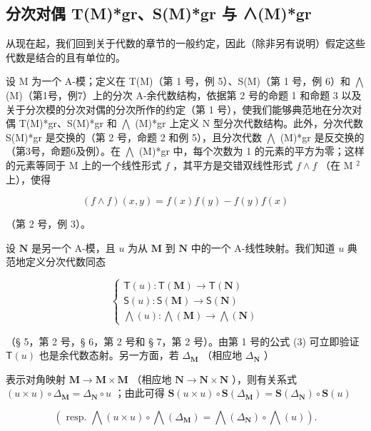 \subsection{分次对偶 T(M)*gr、S(M)*gr 与 ∧(M)*gr}

从现在起，我们回到关于代数的章节的一般约定，因此（除非另有说明）假定这些代数是结合的且有单位的。

设 M 为一个 A-模；定义在 T(M)（第 1 号，例 5）、S(M)（第 1 号，例 6）和 \(\bigwedge\) (M)（第1号，例7）上的分次 A-余代数结构，依据第 2 号的命题 1 和命题 3 以及关于分次模的分次对偶的分次所作的约定（第 1 号），使我们能够典范地在分次对偶 T(M)*gr、S(M)*gr 和 \(\bigwedge\) (M)*gr 上定义 N 型分次代数结构。此外，分次代数 S(M)*gr 是交换的（第 2 号，命题 2 和例 5），且分次代数 \(\bigwedge\) (M)*gr 是反交换的（第3号，命题6及例）。在 \(\bigwedge\) (M)*gr 中，每个次数为 1 的元素的平方为零；这样的元素等同于 M 上的一个线性形式 \(f\) ，其平方是交错双线性形式 \(f \wedge f\) （在 M \(^{2}\) 上），使得

\[
(f \wedge f) (x, y) = f (x) f (y) - f (y) f (x)
\]

（第 2 号，例 3）。

设 \(\mathbf{N}\) 是另一个 A-模，且 \(u\) 为从 \(\mathbf{M}\) 到 \(\mathbf{N}\) 中的一个 A-线性映射。我们知道 \(u\) 典范地定义分次代数同态

\[
\left\{ \begin{array}{l} \mathsf {T} (u): \mathsf {T} (\mathbf {M}) \to \mathsf {T} (\mathbf {N}) \\ \mathsf {S} (u): \mathsf {S} (\mathbf {M}) \to \mathsf {S} (\mathbf {N}) \\ \bigwedge (u): \bigwedge (\mathbf {M}) \to \bigwedge (\mathbf {N}) \end{array} \right.\tag{23}
\]

（§ 5，第 2 号，§ 6，第 2 号和 § 7，第 2 号）。由第 1 号的公式 (3) 可立即验证 \(\mathsf{T}(u)\) 也是余代数态射。另一方面，若 \(\Delta_{\mathbf{M}}\) （相应地 \(\Delta_{\mathbf{N}}\) ）

表示对角映射 \(\mathbf{M} \to \mathbf{M} \times \mathbf{M}\) （相应地 \(\mathbf{N} \to \mathbf{N} \times \mathbf{N}\) ），则有关系式 \((u \times u) \circ \Delta_{\mathbf{M}} = \Delta_{\mathbf{N}} \circ u\) ；由此可得 \(\mathbf{S}(u \times u) \circ \mathbf{S}(\Delta_{\mathbf{M}}) = \mathbf{S}(\Delta_{\mathbf{N}}) \circ \mathbf{S}(u)\)

\[
(\text { resp. } \bigwedge (u \times u) \circ \bigwedge (\Delta_ {\mathbf {M}}) = \bigwedge (\Delta_ {\mathbf {N}}) \circ \bigwedge (u)).
\]

